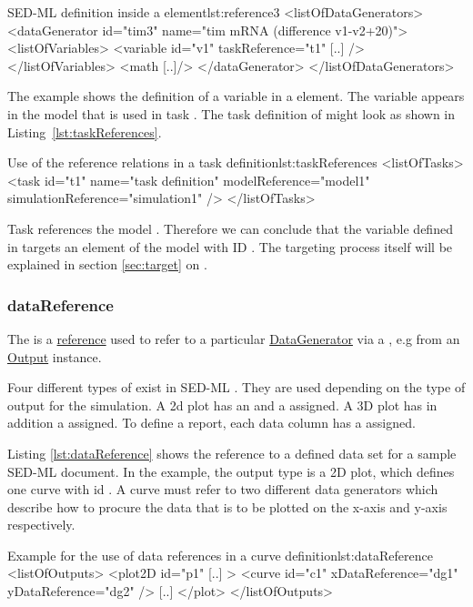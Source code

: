 \begin{myXmlLst}{SED-ML  definition inside a  element}{lst:reference3}
<listOfDataGenerators>
	<dataGenerator id="tim3" name="tim mRNA (difference v1-v2+20)">
	<listOfVariables>
   		<variable id="v1" taskReference="t1" [..] />
  	</listOfVariables>
  	<math [..]/>
	</dataGenerator>
</listOfDataGenerators>
\end{myXmlLst}

The example shows the definition of a variable  in a  element. The variable appears in the model that is used in task . The task definition of  might look as shown in Listing~\ref{lst:taskReferences}.

\begin{myXmlLst}{Use of the reference relations in a task definition}{lst:taskReferences}
<listOfTasks>
	<task id="t1" name="task definition" modelReference="model1" simulationReference="simulation1" />
</listOfTasks>
\end{myXmlLst}
Task  references the model . Therefore we can conclude that the variable  defined in  targets an element of the model with ID . The targeting process itself will be explained in section \ref{sec:target} on .


\subsubsection{dataReference}
\label{sec:dataReference}
The  is a \hyperref[sec:reference]{reference} used to refer to a particular \hyperref[class:dataGenerator]{DataGenerator}
via a \hyperref[type:sidref]{}, e.g from an \hyperref[class:output]{Output} instance.

Four different types of  exist in SED-ML \currentLV. They are used depending on the type of output for the simulation. A 2d plot has an \hyperref[sec:xDataReference]{} and a \hyperref[sec:yDataReference]{} assigned. A 3D plot has in addition a \hyperref[sec:zDataReference]{} assigned. To define a report, each data column has a \hyperref[sec:dataReference1]{} assigned.

Listing \ref{lst:dataReference} shows the reference to a defined data set for a sample SED-ML document. In the example, the output type is a 2D plot, which defines one curve with id . A curve must refer to two different data generators which describe how to procure the data that is to be plotted on the x-axis and y-axis respectively. 

\begin{myXmlLst}{Example for the use of data references in a curve definition}{lst:dataReference}
<listOfOutputs>
	<plot2D id="p1" [..] >
    		<curve id="c1" xDataReference="dg1" yDataReference="dg2" />
		[..]
	</plot>
</listOfOutputs>
\end{myXmlLst}
